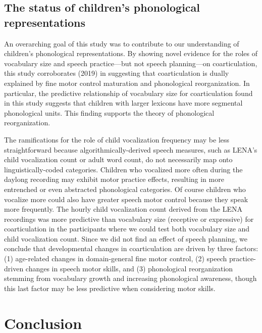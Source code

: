 \documentclass[a4paper,man,natbib,donotrepeattitle, apacite]{apa6}
\begin{document}
\subsection{The status of children’s phonological representations}

An overarching goal of this study was to contribute to our understanding of children’s phonological representations. By showing novel evidence for the roles of vocabulary size and speech practice---but not speech planning---on coarticulation, this study corroborates \citeauthor{noiraySpokenLanguageDevelopment2019} (2019) in suggesting that coarticulation is dually explained by fine motor control maturation and phonological reorganization. In particular, the predictive relationship of vocabulary size for coarticulation found in this study suggests that children with larger lexicons have more segmental phonological units. This finding supports the theory of phonological reorganization. 

The ramifications for the role of child vocalization frequency may be less straightforward because algorithmically-derived speech measures, such as LENA’s child vocalization count or adult word count, do not necessarily map onto linguistically-coded categories. Children who vocalized more often during the daylong recording may exhibit motor practice effects, resulting in more entrenched or even abstracted phonological categories. Of course children who vocalize more could also have greater speech motor control because they speak more frequently. The hourly child vocalization count derived from the LENA recordings was more predictive than vocabulary size (receptive or expressive) for coarticulation in the participants where we could test both vocabulary size and child vocalization count. Since we did not find an effect of speech planning, we conclude that developmental changes in coarticulation are driven by three factors: (1) age-related changes in domain-general fine motor control, (2) speech practice-driven changes in speech motor skills, and (3) phonological reorganization stemming from vocabulary growth and increasing phonological awareness, though this last factor may be less predictive when considering motor skills. 

\section{Conclusion}
\end{document}
